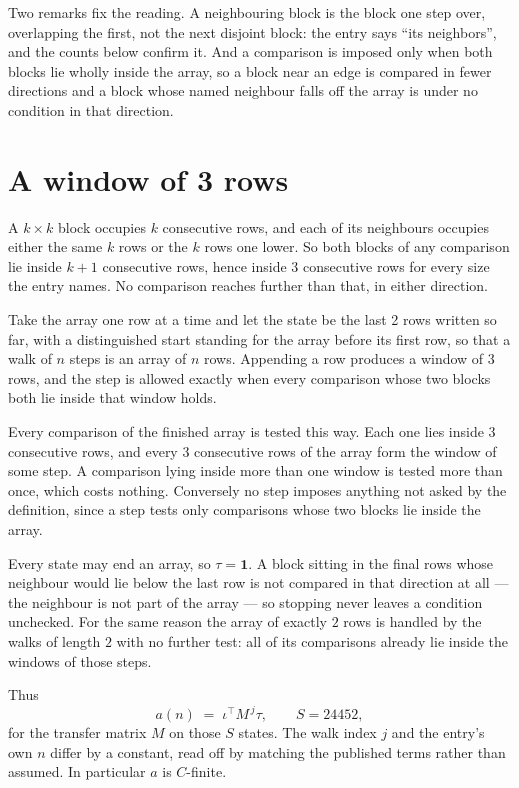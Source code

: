 \documentclass[11pt,a4paper]{article}
\theoremstyle{plain}
\theoremstyle{definition}
\begin{document}
Two remarks fix the reading. A neighbouring block is the block one step over, overlapping the
first, not the next disjoint block: the entry says ``its neighbors'', and the counts below
confirm it. And a comparison is imposed only when both blocks lie wholly inside the array, so a
block near an edge is compared in fewer directions and a block whose named neighbour falls off
the array is under no condition in that direction.

\section{A window of 3 rows}

A $k\times k$ block occupies $k$ consecutive rows, and each of its neighbours occupies either
the same $k$ rows or the $k$ rows one lower. So both blocks of any comparison lie inside $k+1$
consecutive rows, hence inside $3$ consecutive rows for every size the entry names. No
comparison reaches further than that, in either direction.

Take the array one row at a time and let the state be the last 2 rows written so far, with a
distinguished start standing for the array before its first row, so that a walk of $n$ steps is
an array of $n$ rows. Appending a row produces a window of $3$ rows, and the step is
allowed exactly when every comparison whose two blocks both lie inside that window holds.

Every comparison of the finished array is tested this way. Each one lies inside $3$
consecutive rows, and every $3$ consecutive rows of the array form the window of some
step. A comparison lying inside more than one window is tested more than once, which costs
nothing. Conversely no step imposes anything not asked by the definition, since a step tests
only comparisons whose two blocks lie inside the array.

Every state may end an array, so $\tau=\mathbf{1}$. A block sitting in the final rows whose
neighbour would lie below the last row is not compared in that direction at all --- the
neighbour is not part of the array --- so stopping never leaves a condition unchecked. For the
same reason the array of exactly $2$ rows is handled by the walks of length $2$ with no
further test: all of its comparisons already lie inside the windows of those steps.

Thus
\[
a(n)\;=\;\iota^{\!\top}M^{\,j}\tau ,\qquad S=24452,
\]
for the transfer matrix $M$ on those $S$ states. The walk index $j$ and the entry's own $n$
differ by a constant, read off by matching the published terms rather than assumed. In
particular $a$ is $C$-finite.
\end{document}
